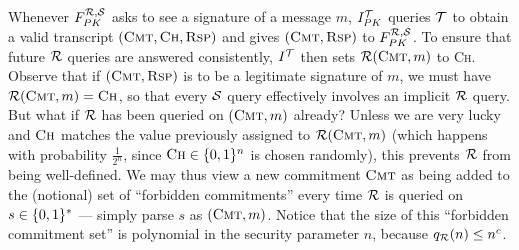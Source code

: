 Whenever $F_{PK}^{\mathcal{R},\mathcal{S}}$ asks to see a signature of a message $m$,
$I_{PK}^{\mathcal{T}}$ queries $\mathcal{T}$ to obtain a valid transcript
$(\textsc{Cmt},\textsc{Ch},\textsc{Rsp})$ and gives
$(\textsc{Cmt},\textsc{Rsp})$ to $F_{PK}^{\mathcal{R},\mathcal{S}}$. To ensure that future
$\mathcal{R}$ queries are answered consistently, $I^{\mathcal{T}}$ then sets
$\mathcal{R}(\textsc{Cmt},m)$ to \textsc{Ch}.
Observe that if $(\textsc{Cmt},\textsc{Rsp})$ is to be a legitimate signature
of $m$, we must have $\mathcal{R}(\textsc{Cmt},m) = \textsc{Ch}$, so that every
$\mathcal{S}$ query effectively involves an implicit $\mathcal{R}$ query. But what if
$\mathcal{R}$ has been queried on $(\textsc{Cmt},m)$ already? Unless we are very
lucky and $\textsc{Ch}$ matches the value previously assigned to
$\mathcal{R}(\textsc{Cmt},m)$ (which happens with probability $\frac{1}{2^n}$, since
$\textsc{Ch} \in \{0,1\}^{n}$ is chosen randomly), this prevents $\mathcal{R}$ from
being well-defined. We may thus view a new commitment $\textsc{Cmt}$ as
being added to the (notional) set of ``forbidden commitments'' every time
$\mathcal{R}$ is queried on $s \in \{0,1\}^{*}$ --- simply parse $s$ as
$(\textsc{Cmt},m)$. Notice that the size of this ``forbidden commitment set''
is polynomial in the security parameter $n$, because $q_{\mathcal{R}}(n) \leq n^c$.
